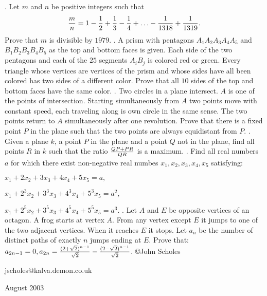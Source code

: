 \nopagenumbers
{}
\vskip 25pt
. Let $m$ and $n$ be positive integers such that $${m\over n}=1-{1\over2}+{1\over3}-{1\over4}+\ldots-{1\over1318}+{1\over1319}.$$ Prove that $m$ is divisible by $1979$.
\vskip 12pt
. A prism with pentagons $A_1A_2A_3A_4A_5$ and $B_1B_2B_3B_4B_5$ as the top and bottom faces is given. Each side of the two pentagons and each of the $25$ segments $A_iB_j$ is colored red or green. Every triangle whose vertices are vertices of the prism and whose sides have all been colored has two sides of a different color. Prove that all $10$ sides of the top and bottom faces have the same color.
\vskip 12pt
. Two circles in a plane intersect. $A$ is one of the points of intersection. Starting simultaneously from $A$ two points move with constant speed, each traveling along is own circle in the same sense. The two points return to $A$ simultaneously after one revolution. Prove that there is a fixed point $P$ in the plane such that the two points are always equidistant from $P$.
\vskip 12pt
. Given a plane $k$, a point $P$ in the plane and a point $Q$ not in the plane, find all points $R$ in $k$ such that the ratio $QP+PR\over QR$ is a maximum.
\vskip 12pt
. Find all real numbers $a$ for which there exist non-negative real numbes $x_1,x_2,x_3,x_4,x_5$ satisfying:

$x_1+2x_2+3x_3+4x_4+5x_5=a,$

$x_1+2^3x_2+3^3x_3+4^3x_4+5^3x_5=a^2,$

$x_1+2^5x_2+3^5x_3+4^5x_4+5^5x_5=a^3.$
\vskip 12pt
. Let $A$ and $E$ be opposite vertices of an octagon. A frog starts at vertex $A$. From any vertex except $E$ it jumps to one of the two adjacent vertices. When it reaches $E$ it stops. Let $a_n$ be the number of distinct paths of exactly $n$ jumps ending at $E$. Prove that: $a_{2n-1}=0,a_{2n}={(2+\sqrt2)^{n-1}\over\sqrt2}-{(2-\sqrt2)^{n-1}\over\sqrt2}$.
\vskip 20pt
\noindent \copyright John Scholes

\noindent jscholes@kalva.demon.co.uk

 August 2003

\bye
